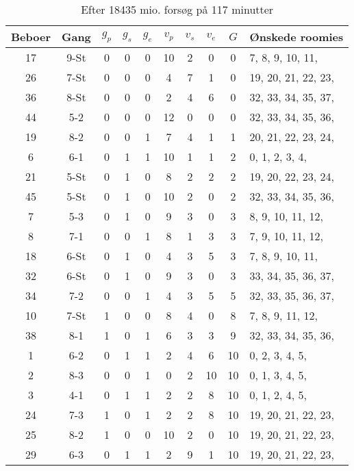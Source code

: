 \documentclass[article,oneside,11pt,a4paper]{memoir}
\newenvironment{assignment}[1]{
\begin{table}[h]
\caption{#1}
\footnotesize
\begin{center}
\begin{tabular}{cccccccccl}
\toprule
Beboer & Gang & $g_p$ & $g_s$ & $g_e$ & $v_p$ & $v_s$ & $v_e$ & $G$ & Ønskede roomies \\ \midrule
}{
\bottomrule
\end{tabular}
\end{center}
\end{table}

}
\begin{document}
\begin{assignment}{Efter 18435 mio. forsøg på 117 minutter}
    17 & 9-St &   0 &   0 &   0 &  10 &   2 &   0 &  0 &   7,  8,  9, 10, 11, \\
    26 & 7-St &   0 &   0 &   0 &   4 &   7 &   1 &  0 &  19, 20, 21, 22, 23, \\
    36 & 8-St &   0 &   0 &   0 &   2 &   4 &   6 &  0 &  32, 33, 34, 35, 37, \\
    44 & 5-2  &   0 &   0 &   0 &  12 &   0 &   0 &  0 &  32, 33, 34, 35, 36, \\
    19 & 8-2  &   0 &   0 &   1 &   7 &   4 &   1 &  1 &  20, 21, 22, 23, 24, \\
     6 & 6-1  &   0 &   1 &   1 &  10 &   1 &   1 &  2 &   0,  1,  2,  3,  4, \\
    21 & 5-St &   0 &   1 &   0 &   8 &   2 &   2 &  2 &  19, 20, 22, 23, 24, \\
    45 & 5-St &   0 &   1 &   0 &  10 &   2 &   0 &  2 &  32, 33, 34, 35, 36, \\
     7 & 5-3  &   0 &   1 &   0 &   9 &   3 &   0 &  3 &   8,  9, 10, 11, 12, \\
     8 & 7-1  &   0 &   0 &   1 &   8 &   1 &   3 &  3 &   7,  9, 10, 11, 12, \\
    18 & 6-St &   0 &   1 &   0 &   4 &   3 &   5 &  3 &   7,  8,  9, 10, 11, \\
    32 & 6-St &   0 &   1 &   0 &   9 &   3 &   0 &  3 &  33, 34, 35, 36, 37, \\
    34 & 7-2  &   0 &   0 &   1 &   4 &   3 &   5 &  5 &  32, 33, 35, 36, 37, \\
    10 & 7-St &   1 &   0 &   0 &   8 &   4 &   0 &  8 &   7,  8,  9, 11, 12, \\
    38 & 8-1  &   1 &   0 &   1 &   6 &   3 &   3 &  9 &  32, 33, 34, 35, 36, \\
     1 & 6-2  &   0 &   1 &   1 &   2 &   4 &   6 & 10 &   0,  2,  3,  4,  5, \\
     2 & 8-3  &   0 &   0 &   1 &   0 &   2 &  10 & 10 &   0,  1,  3,  4,  5, \\
     3 & 4-1  &   0 &   1 &   1 &   2 &   2 &   8 & 10 &   0,  1,  2,  4,  5, \\
    24 & 7-3  &   1 &   0 &   1 &   2 &   2 &   8 & 10 &  19, 20, 21, 22, 23, \\
    25 & 8-2  &   1 &   0 &   0 &  10 &   2 &   0 & 10 &  19, 20, 21, 22, 23, \\
    29 & 6-3  &   0 &   1 &   1 &   2 &   9 &   1 & 10 &  19, 20, 21, 22, 23, \\

\end{assignment}
\end{document}
